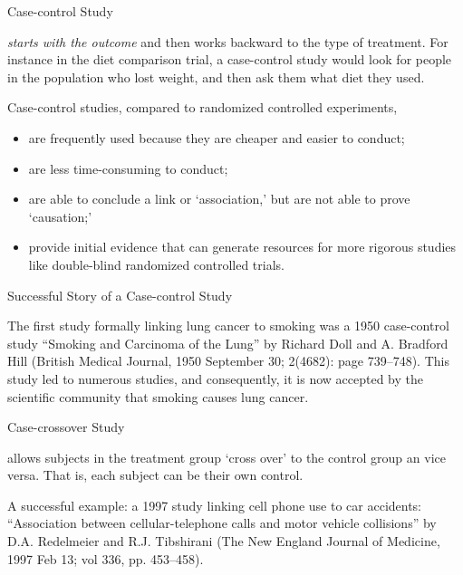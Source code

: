 \documentclass[14pt]{beamer}\usepackage[]{graphicx}\usepackage[]{color}
\begin{document}
\begin{frame}[fragile]{Case-control Study}

{\footnotesize{
\textit{starts with the outcome} and then works backward to the type of treatment. For instance in the diet comparison trial, a case-control study would look for people in the population who lost weight, and then ask them what diet they used.

\vspace{3mm}

Case-control studies, compared to randomized controlled experiments,

\begin{itemize}
\item<1-> are frequently used because they are cheaper and easier to conduct;  
\item<2-> are less time-consuming to conduct;
\item<3-> are able to conclude a link or `association,' but are not able to prove  `causation;'
\item<4-> provide initial evidence that can generate resources for more rigorous  studies like double-blind randomized controlled trials.
\end{itemize}
}}
\end{frame}

\begin{frame}[fragile]{Successful Story of a Case-control Study}

The first study formally linking lung cancer to smoking was a 1950  case-control study ``Smoking and Carcinoma of the Lung'' by Richard  Doll and A. Bradford Hill (British Medical Journal, 1950 September 30;  2(4682): page 739–748). This study led to numerous studies, and  consequently, it is now accepted by the scientific community that  smoking causes lung cancer.

\end{frame}

\begin{frame}[fragile]{Case-crossover Study}

allows subjects in the treatment group `cross over' to the control group  an vice versa. That is, each subject can be their own control.

\vspace{3mm}

A successful example: a 1997 study linking cell phone use to car  accidents: ``Association between cellular-telephone calls and motor  vehicle collisions'' by D.A. Redelmeier and R.J. Tibshirani (The New  England Journal of Medicine, 1997 Feb 13; vol 336, pp. 453–458).
\end{frame}
\end{document}
